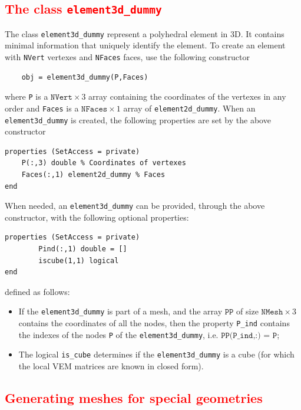 \documentclass[a4paper]{article}
\newcommand{\red}[1]{\textcolor{red}{#1}}
\begin{document}
\subsection{\red{The class \texttt{element3d\_dummy}}}
The class \texttt{element3d\_dummy} represent a polyhedral element in 3D. It contains minimal information that uniquely identify the element. To create an element with \texttt{NVert} vertexes and \texttt{NFaces} faces, use the following constructor
\begin{lstlisting}
	obj = element3d_dummy(P,Faces)
\end{lstlisting}
where \texttt{P} is a $\texttt{NVert} \times 3$ array containing the coordinates of the vertexes in any order and \texttt{Faces} is a $\texttt{NFaces} \times 1$ array of \texttt{element2d\_dummy}.  When an \texttt{element3d\_dummy} is created, the following properties are set by the above constructor
\begin{lstlisting}
properties (SetAccess = private)
	P(:,3) double % Coordinates of vertexes
	Faces(:,1) element2d_dummy % Faces
end
\end{lstlisting}
When needed, an \texttt{element3d\_dummy} can be provided, through the above constructor, with the following optional properties:
\begin{lstlisting}
properties (SetAccess = private)
        Pind(:,1) double = []
        iscube(1,1) logical
end
\end{lstlisting}
defined as follows:
\begin{itemize}
\item If the \texttt{element3d\_dummy} is part of a mesh, and the array $\texttt{PP}$ of size $\texttt{NMesh} \times 3$ contains the coordinates of all the nodes, then the property \texttt{P\_ind} contains the indexes of the nodes \texttt{P} of the \texttt{element3d\_dummy}, i.e. $\texttt{PP(P\_ind,:) = P}$;
\item The logical \texttt{is\_cube} determines if the \texttt{element3d\_dummy} is a cube (for which the local VEM matrices are known in closed form).
\end{itemize}

\subsection{\red{Generating meshes for special geometries}}
\end{document}
